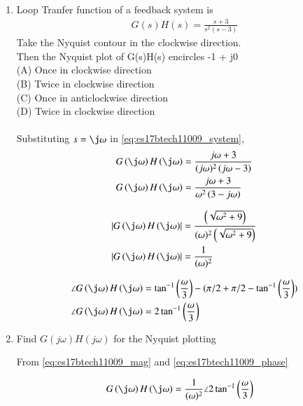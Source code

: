 \begin{enumerate}[label=\thesection.\arabic*.,ref=\thesection.\theenumi]

\item Loop Tranfer function of a feedback system is 
\begin{align}
G(s)H(s) = \frac{s+3}{s^2(s-3)}
\label{eq:es17btech11009_system}
\end{align}
Take the Nyquist contour in the clockwise direction.
\\
Then the Nyquist plot of G(s)H(s) encircles -1 + j0
\\
(A) Once in clockwise direction
\\
(B) Twice in clockwise direction
\\
(C) Once in anticlockwise direction
\\
(D) Twice in clockwise direction
\\
\\
\solution Substituting $s = \j\omega$ in \eqref{eq:es17btech11009_system},
\begin{align}
G\brak{\j\omega}H\brak{\j\omega}&=\frac{j\omega+3}{(j\omega)^2\brak{j\omega- 3}}
\\
G\brak{\j\omega}H\brak{\j\omega}&=\frac{j\omega+3}{\omega^2\brak{3 - j\omega}}
\end{align}

\begin{align}
\abs{G\brak{\j\omega}H\brak{\j\omega}}&=\frac{\brak{\sqrt{\omega^2+9}}}{(\omega)^2\brak{\sqrt{\omega^2+9}}}
\\
\abs{G\brak{\j\omega}H\brak{\j\omega}}&=\dfrac{1}{(\omega)^2}
\label{eq:es17btech11009_mag}
\end{align}

\begin{align}
\angle{G\brak{\j\omega}H\brak{\j\omega}}&=\tan^{-1}\brak{\frac{\omega}{3}} - (\pi/2 + \pi/2 -  \tan^{-1}\brak{\frac{\omega}{3}} )
\\
\angle{G\brak{\j\omega}H\brak{\j\omega}}&= 2\tan^{-1}\brak{\frac{\omega}{3}}
\label{eq:es17btech11009_phase}
\end{align}

\item Find $G(j\omega)H(j\omega)$ for the Nyquist plotting

\solution From \eqref{eq:es17btech11009_mag} and \eqref{eq:es17btech11009_phase} 

\begin{align}
G\brak{\j\omega}H\brak{\j\omega}&= \dfrac{1}{(\omega)^2}\angle2\tan^{-1}\brak{\frac{\omega}{3}}
\end{align}


\end{enumerate}

